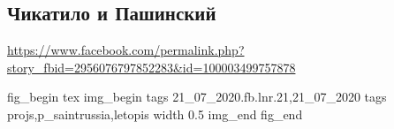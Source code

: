  
 

\subsection{Чикатило и Пашинский}
\label{sec:21_07_2020.fb.lnr.21}
\url{https://www.facebook.com/permalink.php?story_fbid=2956076797852283&id=100003499757878}
  

\ifcmt
fig_begin 
  tex \centering
  img_begin 
    tags 21_07_2020.fb.lnr.21,21_07_2020
    tags projs,p_saintrussia,letopis
    width 0.5
  img_end
fig_end
\fi

